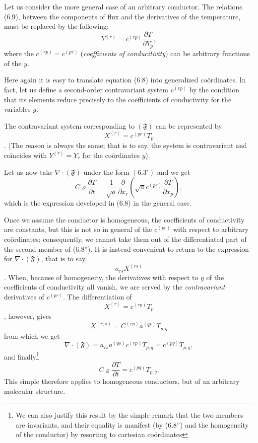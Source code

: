 \documentclass{book}
\begin{document}
Let us consider the more general case of an arbitrary conductor. The relations (6.9), between the components of flux and the derivatives of the temperature, must be replaced by the following:
\begin{equation*}
Y^{(r)}=c^{(rp)}\frac{\partial T}{\partial Y_p},
\tag{6.9'}
\end{equation*}
where the $c^{(rp)}=c^{(pr)}$ (\emph{coefficients of conducitivity}) can be arbitrary functions of the $y$.

Here again it is easy to translate equation (6.8) into generalized co\"ordinates. In fact, let us define a second-order contravariant system $c^{(rp)}$ by the condition that its elements reduce precisely to the coefficients of conductivity for the variables $y$. 

The contravariant system corresponding to $(\mathfrak{F})$ can be represented by
$$X^{(r)}=c^{(pr)}T_p$$.
(The reason is always the same; that is to say, the system is contravariant and co\"incides with $Y^{(r)}=Y_r$ for the co\"ordinates $y$).

Let us now take $\nabla\cdot(\mathfrak{F})$ under the form $(6.3')$ and we get
\begin{equation*}
C\varrho\frac{\partial T}{\partial t}=\frac{1}{\sqrt{a}}\frac{\partial}{\partial x_r}\left(\sqrt{a}c^{(pr)}\frac{\partial T}{\partial x_p}\right),
\tag{6.8''}
\end{equation*}
which is the expression developed in (6.8) in the general case.

Once we assume the conductor is homogeneous, the coefficients of conductivity are constants, but this is not so in general of the $c^{(pr)}$ with respect to arbitrary co\"ordinates; consequently, we cannot take them out of the differentiated part of the second member of (6.8''). It is instead convenient to return to the expression for $\nabla\cdot(\mathfrak{F})$, that is to say,
$$a_{rs}X^{(rs)}$$.
When, because of homogeneity, the derivatives with respect to $y$ of the coefficients of conductivity all vanish, we are served by the \emph{contravariant} derivatives of $c^{(pr)}$. The differentiation of
$$X^{(r)}=c^{(rp)}T_p$$,
however, gives
$$X^{(r,s)}=C^{(rp)}a^{(qs)}T_{p,q}$$
from which we get
$$\nabla\cdot(\mathfrak{F})=a_{rs}a^{(qs)}c^{(rp)}T_{p,q}=c^{(pq)}T_{p,q},$$
and finally\footnote{We can also justify this result by the simple remark that the two members are invariants, and their equality is manifest (by (6.8'') and the homogeneity of the conductor) by resorting to cartesian co\"ordinates}
$$C\varrho\frac{\partial T}{\partial t}=c^{(pq)}T_{p,q}.$$
This simple therefore applies to homogeneous conductors, but of an arbitrary molecular structure.
\end{document}
